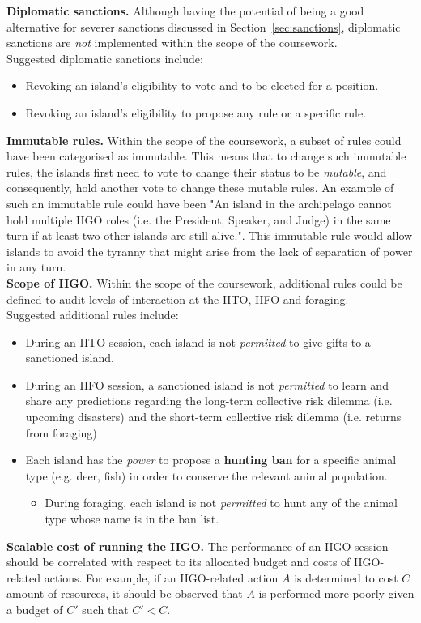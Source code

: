 \textbf{Diplomatic sanctions.} Although having the potential of being a good alternative for severer sanctions discussed in  Section~\ref{sec:sanctions}, diplomatic sanctions are \emph{not} implemented within the scope of the coursework. \\
    Suggested diplomatic sanctions include:
        \begin{itemize}
            \item Revoking an island's eligibility to vote and to be elected for a position.
            \item Revoking an island's eligibility to propose any rule or a specific rule.
        \end{itemize}
\textbf{Immutable rules.} Within the scope of the coursework, a subset of rules could have been categorised as immutable. This means that to change such immutable rules, the islands first need to vote to change their status to be \emph{mutable}, and consequently, hold another vote to change these mutable rules. An example of such an immutable rule could have been "An island in the archipelago cannot hold multiple IIGO roles (i.e. the President, Speaker, and Judge) in the same turn if at least two other islands are still alive.". This immutable rule would allow islands to avoid the tyranny that might arise from the lack of separation of power in any turn.\\
\textbf{Scope of IIGO.} Within the scope of the coursework, additional rules could be defined to audit levels of interaction at the IITO, IIFO and foraging. \\
    Suggested additional rules include:
        \begin{itemize}
            \item During an IITO session, each island is not \emph{permitted} to give gifts to a sanctioned island.
             \item During an IIFO session, a sanctioned island is not \emph{permitted} to learn and share any predictions regarding the long-term collective risk dilemma (i.e. upcoming disasters) and the short-term collective risk dilemma (i.e. returns from foraging)
             \item Each island has the \emph{power} to propose a \textbf{hunting ban} for a specific animal type (e.g. deer, fish) in order to conserve the relevant animal population.
             \begin{itemize}
                \item During foraging, each island is not \emph{permitted} to hunt any of the animal type whose name is in the ban list.
             \end{itemize}  
        \end{itemize}
\textbf{Scalable cost of running the IIGO.} The performance of an IIGO session should be correlated with respect to its allocated budget and costs of IIGO-related actions. For example, if an IIGO-related action $A$ is determined to cost $C$ amount of resources, it should be observed that $A$ is performed more poorly given a budget of $C'$ such that $C' < C$.
